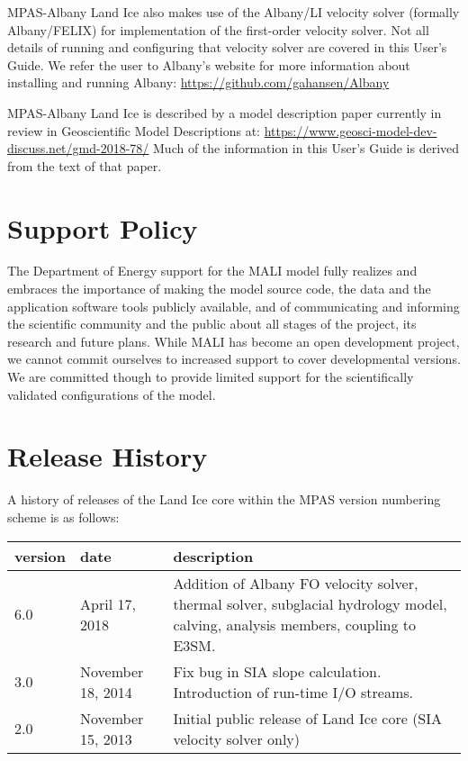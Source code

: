 MPAS-Albany Land Ice also makes use of the Albany/LI velocity solver (formally Albany/FELIX) for implementation of the first-order
velocity solver.  Not all details of running and configuring that velocity solver are covered in this User's Guide.  
We refer the user to Albany's website for more information about installing and running Albany: \url{https://github.com/gahansen/Albany}

MPAS-Albany Land Ice is described by a model description paper currently in review in Geoscientific Model Descriptions at:
\url{https://www.geosci-model-dev-discuss.net/gmd-2018-78/}
Much of the information in this User's Guide is derived from the text of that paper.

\section{Support Policy}
The Department of Energy support for the MALI model fully realizes and embraces the importance of making the model source code, 
the data and the application software tools publicly available, 
and of communicating and informing the scientific community and the public about all stages of the project, its research and future plans.
While MALI has become an open development project, we cannot commit ourselves to increased support to cover developmental versions. 
We are committed though to provide limited support for the scientifically validated configurations of the model.

\section{Release History}
A history of releases of the Land Ice core within the MPAS version numbering scheme is as follows:

\begin{tabular}{p{1.5cm} p{3.7cm} p{10cm}} 
\hline\hline version & date & description  \\
\hline 
6.0 & April 17, 2018 & Addition of Albany FO velocity solver, thermal solver, subglacial hydrology model, calving, analysis members, coupling to E3SM.\\
\hline 
3.0 & November 18, 2014 & Fix bug in SIA slope calculation.  Introduction of run-time I/O streams. \\
\hline 
2.0 & November 15, 2013 & Initial public release of Land Ice core (SIA velocity solver only) \\
\hline 
\end{tabular} 

